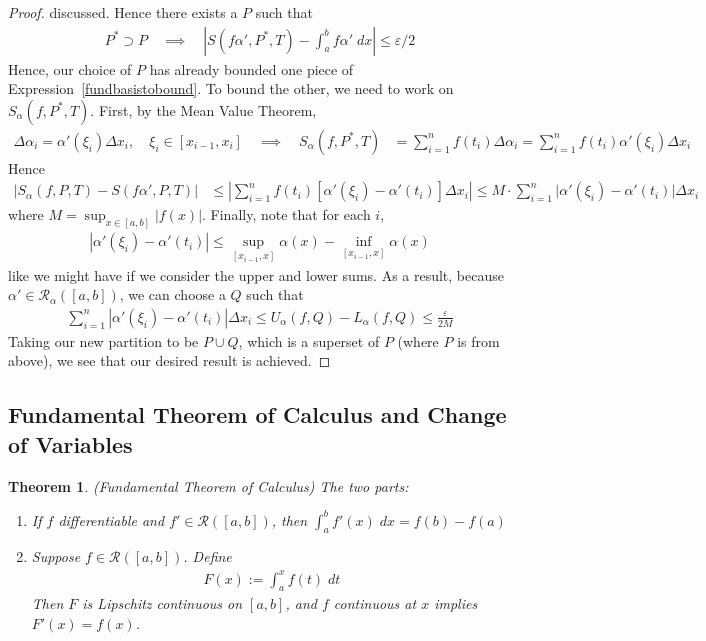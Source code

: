 \documentclass[12pt]{book}
\numberwithin{equation}{section} %
\theoremstyle{plain}
\newtheorem{thm}{Theorem}[section]
\theoremstyle{definition}
\theoremstyle{remark}
\begin{document}
\begin{proof}
discussed. Hence there exists a $P$ such that
\begin{align*}
  P^*\supset P
  \quad\implies\quad
  \left\lvert S(f\alpha',P^*,T) - \int^b_a f\alpha'\;dx
  \right\rvert \leq \varepsilon/2
\end{align*}
Hence, our choice of $P$ has already bounded one piece
of Expression~\ref{fundbasistobound}. To bound the other, we need to
work on $S_\alpha(f,P^*,T)$. First, by the Mean Value Theorem,
\begin{align*}
  \Delta\alpha_i = \alpha'(\xi_i) \Delta x_i,
  \quad \xi_i \in [x_{i-1}, x_i]
  \quad\implies\quad
  S_\alpha(f,P^*,T)
  &= \sum^n_{i=1} f(t_i) \Delta\alpha_i
  = \sum^n_{i=1} f(t_i)\alpha'(\xi_i) \Delta x_i
\end{align*}
Hence
\begin{align*}
  \left\lvert S_\alpha(f,P,T) - S(f\alpha',P,T)
      \right\rvert &\leq
      \left\lvert \sum^n_{i=1} f(t_i)\left[\alpha'(\xi_i) -
      \alpha'(t_i)\right] \Delta x_i \right\rvert
  \leq M \cdot
      \sum^n_{i=1} \big\lvert \alpha'(\xi_i) -
      \alpha'(t_i)\big\rvert \Delta x_i
\end{align*}
where $M =\sup_{x\in[a,b]}\left\lvert f(x)\right\rvert$. Finally, note
that for each $i$,
\begin{align*}
    |\alpha'(\xi_i) - \alpha'(t_i)| \leq
    \sup_{[x_{i-1}, x]} \alpha(x) -
    \inf_{[x_{i-1}, x]} \alpha(x)
\end{align*}
like we might have if we consider the upper and lower sums. As a result,
because $\alpha'\in\mathscr{R}_\alpha([a,b])$, we can choose a $Q$ such
that
\begin{align*}
    \sum^n_{i=1} \left\lvert \alpha'(\xi_i) -
    \alpha'(t_i)\right\rvert \Delta x_i
    \leq U_\alpha(f,Q) - L_\alpha(f,Q) \leq \frac{\varepsilon}{2M}
\end{align*}
Taking our new partition to be $P \cup Q$, which is a superset of $P$
(where $P$ is from above), we see that our desired result is achieved.
\end{proof}

\newpage
\subsection{Fundamental Theorem of Calculus and Change of Variables}

\begin{thm}\emph{(Fundamental Theorem of Calculus)}
\label{ftc}
The two parts:
\begin{enumerate}[label=\emph{\Roman*.}]
  \item
    If $f$ differentiable and $f'\in\mathscr{R}([a,b])$, then
    $\int^b_a f'(x)\;dx = f(b) - f(a)$
  \item
    Suppose $f\in\mathscr{R}([a,b])$.
    Define
    \begin{align*}
      F(x) := \int^x_a f(t)\;dt
    \end{align*}
    Then $F$ is Lipschitz continuous on $[a,b]$,
    and $f$ continuous at $x$ implies $F'(x)=f(x)$.
\end{enumerate}
\end{thm}
\end{document}
